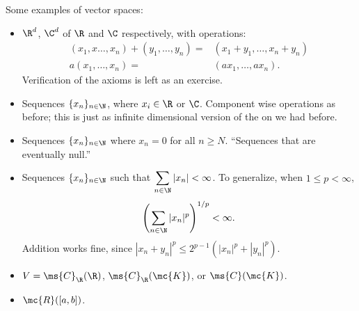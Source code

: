 \medskip

Some examples of vector spaces:
\begin{itemize}
    \item \(\R^d\), \(\C^d\) of \(\R\) and \(\C\) respectively, with operations:
    \begin{align*} 
        (x_1,x\dots,x_n)+(y_1,\dots,y_n)=&(x_1+y_1,\dots,x_n+y_n)\\
        a(x_1,\dots,x_n)=&(ax_1,\dots,ax_n).
    \end{align*}
    Verification of the axioms is left as an exercise.

    \item Sequences \(\{x_n\}_{n\in\N}\), where \(x_i\in\R\) or \(\C\). Component wise operations as before; this is just as infinite dimensional version of the on we had before.
    
    \item Sequences \(\{x_n\}_{n\in\N}\) where \(x_n=0\) for all \(n\geq N\). ``Sequences that are eventually null.''
    
    \item Sequences \(\{x_n\}_{n\in\N}\) such that \(\displaystyle\sum_{n\in\N}|x_n|<\infty\). To generalize, when \(1\leq p<\infty\), 
    \begin{equation*} 
        \left(\sum_{n\in\N} |x_n|^p\right)^{1/p}<\infty.
    \end{equation*}
    Addition works fine, since \(|x_n+y_n|^p\leq 2^{p-1}(|x_n|^p+|y_n|^p)\).

    \item \(V=\ms{C}_{\R}(\R)\), \(\ms{C}_{\R}(\mc{K})\), or \(\ms{C}(\mc{K})\).
    
    \item \(\mc{R}([a,b])\).
\end{itemize}

